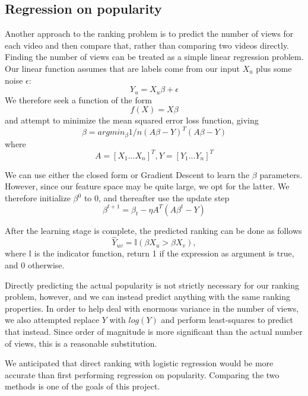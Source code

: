 \subsection{Regression on popularity}
\label{sec:regression}
Another approach to the ranking problem is to predict the number of views for each video and then compare that, rather than comparing two videos directly. Finding the number of views can be treated as a simple linear regression problem. Our linear function assumes that are labels come from our input $X_u$ plus some noise $\epsilon$:
\begin{equation}
Y_u = X_u \beta + \epsilon
\end{equation}
We therefore seek a function of the form
\begin{equation}
f(X) = X \beta
\end{equation}
and attempt to minimize the mean squared error loss function, giving
\begin{equation}
\beta = arg min_\beta 1/n (A \beta - Y)^T(A \beta - Y)
\end{equation}
where
\begin{equation}
A = [X_1 ... X_n]^T, Y = [Y_1 ... Y_n]^T
\end{equation}
  
We can use either the closed form or Gradient Descent to learn the $\beta$ parameters.  However, since our feature space may be quite large, we opt for the latter.  We therefore initialize $\beta^0$ to 0, and thereafter use the update step
\begin{equation}
\beta^{t+1} = \beta_t - \eta A^T (A \beta^t - Y)
\end{equation}
 
After the learning stage is complete, the predicted ranking can be done as follows
\begin{equation}
\hat{Y}_{uv} = \mathbb{I}(\beta X_u > \beta X_v),
\end{equation}
where $\mathbb{I}$ is the indicator function, return 1 if the expression as argument is true, and 0 otherwise.

Directly predicting the actual popularity is not strictly necessary for our ranking problem, however, and we can instead predict anything with the same ranking properties.  In order to help deal with enormous variance in the number of views, we also attempted replace $Y$ with $log(Y)$ and perform least-squares to predict that instead.  Since order of magnitude is more significant than the actual number of views, this is a reasonable substitution.

We anticipated that direct ranking with logistic regression would be more accurate than first performing regression on popularity.  Comparing the two methods is one of the goals of this project.
